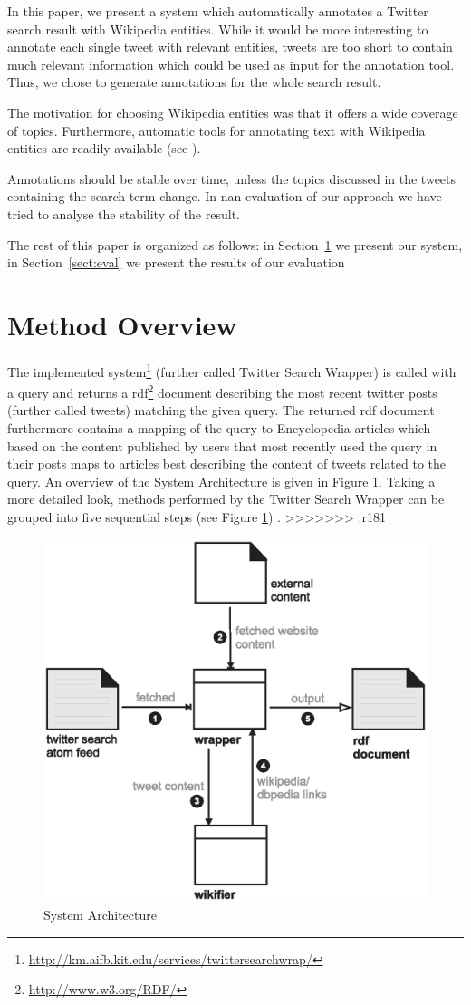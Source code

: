 \documentclass{llncs}
\begin{document}
In this paper, we present a system which automatically annotates a Twitter search result with Wikipedia entities. While it would be more interesting to annotate each single tweet with relevant entities, tweets are too short to contain much relevant information which could be used as input for the annotation tool. Thus, we chose to generate annotations for the whole search result. 

The motivation for choosing Wikipedia entities was that it offers a wide coverage of topics. Furthermore, automatic tools for annotating text with Wikipedia entities are readily available (see \cite{key:wikifier}).

Annotations should be stable over time, unless the topics discussed in the tweets containing the search term change. In nan evaluation of our approach we have tried to analyse the stability of the result.

The rest of this paper is organized as follows: in Section~\ref{sect:method} we present our system, in Section~\ref{sect:eval} we present the results of our evaluation

\section{Method Overview}
\label{sect:method}

The implemented
system\footnote{\url{http://km.aifb.kit.edu/services/twittersearchwrap/}}
(further called Twitter Search Wrapper) is called with a query and returns a
rdf\footnote{\url{http://www.w3.org/RDF/}} document describing the most recent
twitter posts (further called tweets) matching the given query. The returned rdf
document furthermore contains a mapping of the query to Encyclopedia articles
which based on the content published by users that most recently used the query
in their posts maps to articles best describing the content of tweets related to
the query. An overview of the System Architecture is given in Figure
\ref{fig:arch}. Taking a more detailed look, methods performed by the Twitter
Search Wrapper can be grouped into five sequential steps (see Figure
\ref{fig:arch}) .
>>>>>>> .r181
 
\begin{figure}[htb]
  \centering
  \includegraphics[width=.6\linewidth]{architecture}
  \caption{System Architecture}
  \label{fig:arch}
\end{figure}
\end{document}
